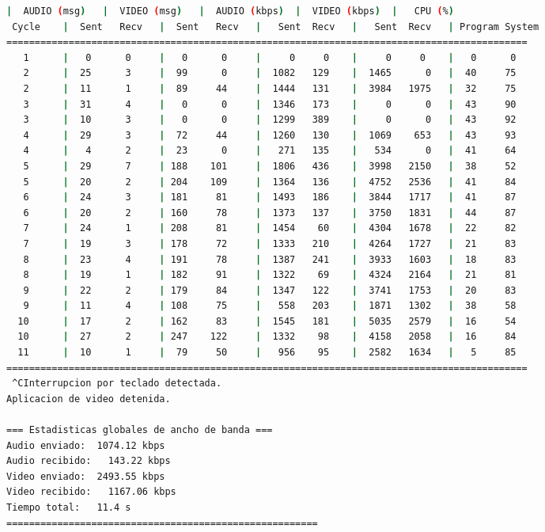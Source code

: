 \begin{adjustbox}{max width=\textwidth}
\begin{lstlisting}[language=bash,basicstyle=\ttfamily\scriptsize]
          |  AUDIO (msg)   |  VIDEO (msg)   |  AUDIO (kbps)  |  VIDEO (kbps)  |   CPU (%)
 Cycle    |  Sent   Recv   |  Sent   Recv   |   Sent  Recv   |   Sent  Recv   | Program System
============================================================================================
   1      |   0      0     |   0      0     |     0     0    |     0     0    |   0      0
   2      |  25      3     |  99      0     |  1082   129    |  1465      0   |  40     75
   2      |  11      1     |  89     44     |  1444   131    |  3984   1975   |  32     75
   3      |  31      4     |   0      0     |  1346   173    |     0      0   |  43     90
   3      |  10      3     |   0      0     |  1299   389    |     0      0   |  43     92
   4      |  29      3     |  72     44     |  1260   130    |  1069    653   |  43     93
   4      |   4      2     |  23      0     |   271   135    |   534      0   |  41     64
   5      |  29      7     | 188    101     |  1806   436    |  3998   2150   |  38     52
   5      |  20      2     | 204    109     |  1364   136    |  4752   2536   |  41     84
   6      |  24      3     | 181     81     |  1493   186    |  3844   1717   |  41     87
   6      |  20      2     | 160     78     |  1373   137    |  3750   1831   |  44     87
   7      |  24      1     | 208     81     |  1454    60    |  4304   1678   |  22     82
   7      |  19      3     | 178     72     |  1333   210    |  4264   1727   |  21     83
   8      |  23      4     | 191     78     |  1387   241    |  3933   1603   |  18     83
   8      |  19      1     | 182     91     |  1322    69    |  4324   2164   |  21     81
   9      |  22      2     | 179     84     |  1347   122    |  3741   1753   |  20     83
   9      |  11      4     | 108     75     |   558   203    |  1871   1302   |  38     58
  10      |  17      2     | 162     83     |  1545   181    |  5035   2579   |  16     54
  10      |  27      2     | 247    122     |  1332    98    |  4158   2058   |  16     84
  11      |  10      1     |  79     50     |   956    95    |  2582   1634   |   5     85
============================================================================================
 ^CInterrupcion por teclado detectada.
Aplicacion de video detenida.

=== Estadisticas globales de ancho de banda ===
Audio enviado:	1074.12 kbps
Audio recibido:   143.22 kbps
Video enviado:	2493.55 kbps
Video recibido:   1167.06 kbps
Tiempo total: 	11.4 s
=======================================================


\end{lstlisting}
\end{adjustbox}
